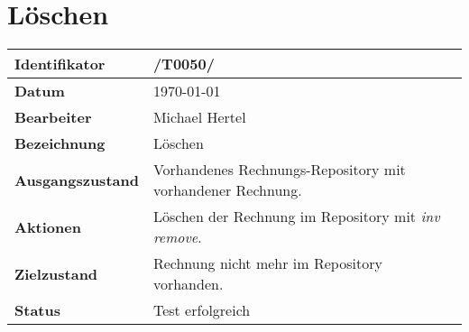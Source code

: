 
\section{Löschen}

\renewcommand{\arraystretch}{1.5}

\begin{center}
 \begin{tabular}{|p{}|p{}|}
	\hline
	\textbf{Identifikator}  & /T0050/ \\
	\hline
	\textbf{Datum} & \today \\
	\hline
	\textbf{Bearbeiter} & Michael Hertel \\
	\hline
	\textbf{Bezeichnung} & Löschen \\
	\hline
	\textbf{Ausgangszustand} & 
		Vorhandenes Rechnungs-Repository mit vorhandener Rechnung. \\
	\hline
	\textbf{Aktionen} & 
		Löschen der Rechnung im Repository mit \textit{inv remove}. \\
	\hline
	\textbf{Zielzustand} & 
		Rechnung nicht mehr im Repository vorhanden. \\
	\hline
	\textbf{Status} & Test erfolgreich \\
	\hline
 \end{tabular}
\end{center}
